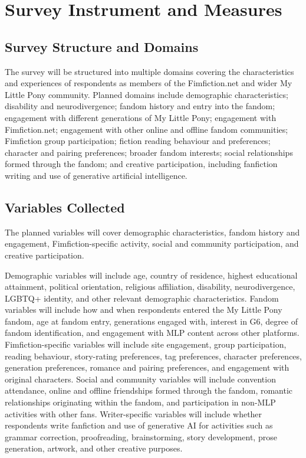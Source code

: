 \section{Survey Instrument and Measures}

\subsection{Survey Structure and Domains}

The survey will be structured into multiple domains covering the characteristics and experiences of respondents as members of the Fimfiction.net and wider My Little Pony community. Planned domains include demographic characteristics; disability and neurodivergence; fandom history and entry into the fandom; engagement with different generations of My Little Pony; engagement with Fimfiction.net; engagement with other online and offline fandom communities; Fimfiction group participation; fiction reading behaviour and preferences; character and pairing preferences; broader fandom interests; social relationships formed through the fandom; and creative participation, including fanfiction writing and use of generative artificial intelligence.


\subsection{Variables Collected}

The planned variables will cover demographic characteristics, fandom history and engagement, Fimfiction-specific activity, social and community participation, and creative participation.

Demographic variables will include age, country of residence, highest educational attainment, political orientation, religious affiliation, disability, neurodivergence, LGBTQ+ identity, and other relevant demographic characteristics. Fandom variables will include how and when respondents entered the My Little Pony fandom, age at fandom entry, generations engaged with, interest in G6, degree of fandom identification, and engagement with MLP content across other platforms. Fimfiction-specific variables will include site engagement, group participation, reading behaviour, story-rating preferences, tag preferences, character preferences, generation preferences, romance and pairing preferences, and engagement with original characters. Social and community variables will include convention attendance, online and offline friendships formed through the fandom, romantic relationships originating within the fandom, and participation in non-MLP activities with other fans. Writer-specific variables will include whether respondents write fanfiction and use of generative AI for activities such as grammar correction, proofreading, brainstorming, story development, prose generation, artwork, and other creative purposes.

